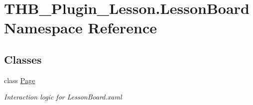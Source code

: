 \hypertarget{namespace_t_h_b___plugin___lesson_1_1_lesson_board}{}\section{T\+H\+B\+\_\+\+Plugin\+\_\+\+Lesson.\+Lesson\+Board Namespace Reference}
\label{namespace_t_h_b___plugin___lesson_1_1_lesson_board}
\subsection*{Classes}
\begin{DoxyCompactItemize}
\item 
class \mbox{\hyperlink{class_t_h_b___plugin___lesson_1_1_lesson_board_1_1_page}{Page}}
\begin{DoxyCompactList}\small\item\em Interaction logic for Lesson\+Board.\+xaml \end{DoxyCompactList}\end{DoxyCompactItemize}
